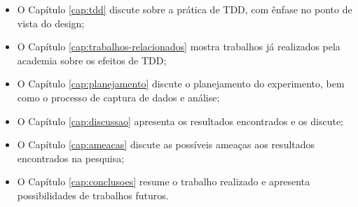 \begin{itemize}
	\item O Capítulo \ref{cap:tdd} discute sobre a prática de TDD, com ênfase no
	ponto de vista do design;
  
	\item O Capítulo \ref{cap:trabalhos-relacionados} mostra trabalhos já
	realizados pela academia sobre os efeitos de TDD;

	\item O Capítulo \ref{cap:planejamento} discute o planejamento do experimento,
	bem como o processo de captura de dados e análise;

	\item O Capítulo \ref{cap:discussao} apresenta os resultados encontrados e
	os discute;
	
	\item O Capítulo \ref{cap:ameacas} discute as possíveis ameaças aos resultados
	encontrados na pesquisa;
	
	\item O Capítulo \ref{cap:conclusoes} resume o trabalho realizado e apresenta
	possibilidades de trabalhos futuros.
\end{itemize}

